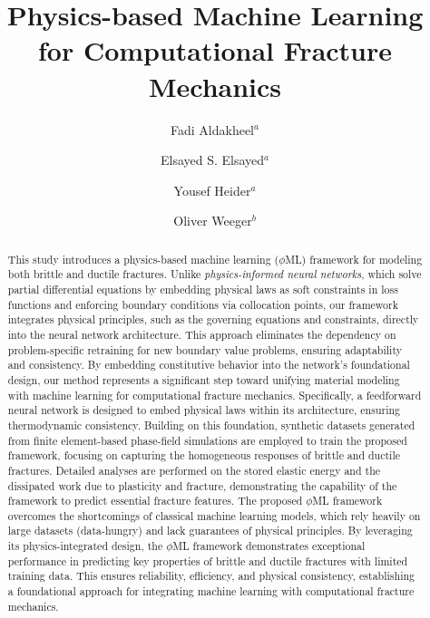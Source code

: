 \documentclass[final,3p,times]{elsarticle}
\begin{document}
\begin{frontmatter}

\title{Physics-based Machine Learning for Computational Fracture Mechanics}

%
\author{Fadi Aldakheel\(^{a}\)}
%
\author{Elsayed S. Elsayed\(^{a}\)}
%
\author{Yousef Heider\(^{a}\)}
%
\author{Oliver Weeger\(^{b}\)}


\address{ \(^a\) Institute of Mechanics and Computational Mechanics, Leibniz Universit\"at Hannover, Appelstrasse 9a, 30167 Hannover, Germany} 

\address{ \(^b\) Cyber-Physical Simulation, Department of Mechanical Engineering, Technical University of Darmstadt, 64293 Darmstadt, Germany} 

\begin{abstract}
%
This study introduces a physics-based machine learning ($\phi$ML) framework for modeling both brittle and ductile fractures. Unlike {\it physics-informed neural networks}, which solve partial differential equations by embedding physical laws as soft constraints in loss functions and enforcing boundary conditions via collocation points, our framework integrates physical principles, such as the governing equations and constraints, directly into the neural network architecture. This approach eliminates the dependency on problem-specific retraining for new boundary value problems, ensuring adaptability and consistency. By embedding constitutive behavior into the network's foundational design, our method represents a significant step toward unifying material modeling with machine learning for computational fracture mechanics. Specifically, a feedforward neural network is designed to embed physical laws within its architecture, ensuring thermodynamic consistency.
%
Building on this foundation, synthetic datasets generated from finite element-based phase-field simulations are employed to train the proposed framework, focusing on capturing the homogeneous responses of brittle and ductile fractures. Detailed analyses are performed on the stored elastic energy and the dissipated work due to plasticity and fracture, demonstrating the capability of the framework to predict essential fracture features.
%
The proposed $\phi$ML framework overcomes the shortcomings of classical machine learning models, which rely heavily on large datasets (data-hungry) and lack guarantees of physical principles. By leveraging its physics-integrated design, the $\phi$ML framework demonstrates exceptional performance in predicting key properties of brittle and ductile fractures with limited training data. This ensures reliability, efficiency, and physical consistency, establishing a foundational approach for integrating machine learning with computational fracture mechanics.
%
\end{abstract}



\end{frontmatter}
\end{document}
